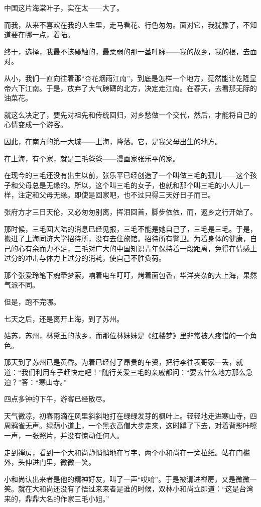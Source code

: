 \par 中国这片海棠叶子，实在太——大了。
\par 而我，从来不喜欢在我的人生里，走马看花、行色匆匆。面对它，我犹豫了，不知道要在哪一点，着陆。
\par 终于，选择，我最不该碰触的，最柔弱的那一茎叶脉——我的故乡，我的根，去面对。
\par 从小，我们一直向往着那“杏花烟雨江南”，到底是怎样一个地方，竟然能让乾隆皇帝六下江南。于是，放弃了大气磅礴的北方，决定走江南。在春天，去看那无际的油菜花。
\par 就这么决定了，要先对祖先和传统回归，对乡愁做一个交代，然后，才能将自己的心情变成一个游客。
\par 因此，在南方的第一大城——上海，降落。它，是我父母出生的地方。
\par 在上海，有个家，就是三毛爸爸——漫画家张乐平的家。
\par 在现今的三毛还没有出生以前，张乐平已经创造了一个叫做三毛的孤儿——这个孩子和父母总是无缘的。所以，这个叫三毛的女子，也就和那个叫三毛的小人儿一样，注定和父母无缘。即使是回家吧，也不过只得三天好日子而已。
\par 张府方才三日天伦，又必匆匆别离，挥泪回首，脚步依依，而，返乡之行开始了。
\par 那时候，三毛回大陆的消息已经见报，三毛不能是她自己了，三毛是三毛。于是，搬进了上海同济大学招待所，没有去住旅馆。招待所有警卫。为着身体的健康，自己的心有余而力不足，三毛对广大的中国知识青年保持着一段距离，免得在情感上过分的冲击与体力上过分的消耗，使自己不胜负荷。
\par 那个张爱玲笔下魂牵梦萦，响着电车叮叮，烤着面包香，华洋夹杂的大上海，果然气派不同。
\par 但是，跑不完哪。
\par 七天之后，还是离开上海，到了苏州。
\par 姑苏，苏州，林黛玉的故乡，而那位林妹妹是《红楼梦》里非常被人疼惜的一个角色。
\par 那天到了苏州已是黄昏。为着已经付了昂贵的车资，把行李往表哥家一丢，就道：“我们利用车子赶快走吧！”随行关爱三毛的亲戚都问：“要去什么地方那么急迫？”答：“寒山寺。”
\par 四点多钟的下午，游客已经散尽。
\par 天气微凉，初春雨滴在风里斜斜地打在绿绿发芽的枫叶上。轻轻地走进寒山寺，四周鸦雀无声。绿荫小道上，一个黑衣高僧大步走来，这时蹲了下去，对着背影咔嚓一声，一张照片，并没有惊动任何人。
\par 走到禅房，看到一个大和尚静悄悄地在写字，两个小和尚在一旁拉纸。站在门槛外，头伸进门里，微微一笑。
\par 小和尚认出来者是他的精神好友，叫了一声“哎唷”。于是被请进禅房，又是微微一笑。就在大和尚还没有了悟过来来者是谁的时候，双林小和尚立即道：“这是台湾来的，鼎鼎大名的作家三毛小姐。”
